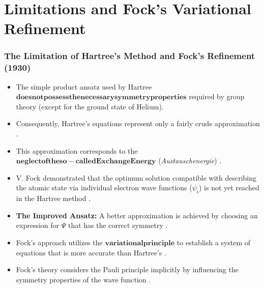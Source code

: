 \section{Limitations and Fock's Variational Refinement}
\begin{frame}
    \frametitle{The Limitation of Hartree's Method and Fock's Refinement (1930)}
    \begin{itemize}
        \item The simple product ansatz  used by Hartree $\mathbf{does not possess the necessary symmetry properties}$ required by group theory (except for the ground state of Helium).
        \item Consequently, Hartree's equations represent only a fairly crude approximation .
        \item This approximation corresponds to the $\mathbf{neglect of the so-called Exchange Energy}$ (\textit{Austauschenergie}) .
        \item V. Fock demonstrated that the optimum solution compatible with describing the atomic state via individual electron wave functions ($\psi_i$) is not yet reached in the Hartree method .
        \item \textbf{The Improved Ansatz:} A better approximation is achieved by choosing an expression for $\Psi$ that has the correct symmetry .
        \item Fock's approach utilizes the $\mathbf{variational principle}$ to establish a system of equations that is more accurate than Hartree's .
        \item Fock's theory considers the Pauli principle implicitly by influencing the symmetry properties of the wave function .
    \end{itemize}
\end{frame}

